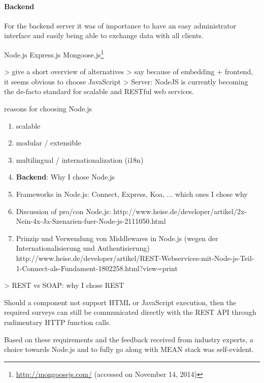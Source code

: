 	\paragraph{Backend}

		For the backend server it was of importance to have an easy administrator interface and easily being able to exchange data with all clients. 


			Node.js
			Express.js
			Mongoose.js\footnote{\url{http://mongoosejs.com/} (accessed on November 14, 2014)}


		> give a short overview of alternatives
		> say because of embedding + frontend, it seems obvious to choose JavaScript
		> Server: NodeJS is currently becoming the de-facto standard for scalable and RESTful web services.

		reasons for choosing Node.js


			\begin{enumerate}[itemsep=0pt] 
			\item scalable
			\item modular / extensible
			\item multilingual / internationalization (i18n)

	        \item \textbf{Backend}: Why I chose Node.js
	        \item Frameworks in Node.js: Connect, Express, Koa, ... which ones I chose why
	        \item Discussion of pro/con Node.js: http://www.heise.de/developer/artikel/2x-Nein-4x-Ja-Szenarien-fuer-Node-js-2111050.html
	        \item Prinzip und Verwendung von Middlewares in Node.js (wegen der Internationalisierung und Authentisierung) http://www.heise.de/developer/artikel/REST-Webservices-mit-Node-js-Teil-1-Connect-als-Fundament-1802258.html?view=print

			\end{enumerate}


	
		> REST vs SOAP: why I chose REST

		Should a component not support HTML or JavaScript execution, then the required surveys can still be communicated directly with the REST API through rudimentary HTTP function calls.

		Based on these requirements and the feedback received from industry experts, a choice towards Node.js and to fully go along with MEAN stack was self-evident.




